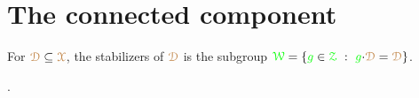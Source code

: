 \begin{comment}
\begin{proof}
  Assume inductively that $\mrD\cap{\gr g'}{\cdot}\mrD$ is $H$-wide, where ${\gr g'}\in\<\,({\gr g})_{K}^2\>$.
  Pick two arbitrary ${\gr a},{\gr b}\in({\gr g})_K$.
  We claim that $\mrD\cap{\gr a}{\cdot}{\gr b}{\cdot}{\gr g'}{\cdot}\mrD$ is $H$-wide.
  From the induction hypothesis it follows that ${\gr b}{\cdot}\mrD\cap{\gr b}{\cdot}{\gr g'}{\cdot}\mrD$ is $H$-wide.
  By Fact~\ref{prop_wideHcojugate_symm}, ${\gr a^{-1}}{\cdot}\mrD\cap{\gr b}{\cdot}{\gr g'}{\cdot}\mrD$ is $H$-wide and the claim follows.
\end{proof}
\end{comment}

\section{The connected component}

For ${\color{brown}\EuScript D}\subseteq{\color{brown}\EuScript X}$, the stabilizers of ${\color{brown}\EuScript D}$ is the subgroup ${\color{green}\EuScript W}=\{{\color{green} g}\in{\color{green}\EuScript Z}\ :\ {\color{green} g}{\cdot}{\color{brown}\EuScript D}={\color{brown}\EuScript D}\}$.

\begin{definition}\label{def_G0}\noindent\vspace*{0.1ex}

  .\smallskip

\end{definition}





